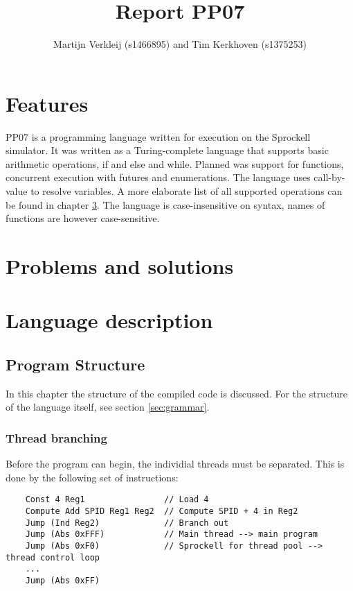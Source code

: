 \documentclass[10pt,a4paper]{report}
\author{Martijn Verkleij (s1466895) and Tim Kerkhoven (s1375253)}
\title{Report PP07}
\begin{document}
\maketitle
\tableofcontents


\chapter{Features}
PP07 is a programming language written for execution on the Sprockell simulator. It was written as a Turing-complete language that supports basic arithmetic operations, if and else and while. Planned was support for functions, concurrent execution with futures and enumerations. The language uses call-by-value to resolve variables. A more elaborate list of all supported operations can be found in chapter \ref{chp:langdesc}. The language is case-insensitive on syntax, names of functions are however case-sensitive.

\chapter{Problems and solutions}



\chapter{Language description} \label{chp:langdesc}

\section{Program Structure} \label{sec:structure}
In this chapter the structure of the compiled code is discussed. For the structure of the language itself, see section \ref{sec:grammar}. 
\subsection{Thread branching}
Before the program can begin, the individial threads must be separated. This is done by the following set of instructions:
\begin{verbatim}
	Const 4 Reg1				// Load 4
	Compute Add SPID Reg1 Reg2	// Compute SPID + 4 in Reg2
	Jump (Ind Reg2)				// Branch out
	Jump (Abs 0xFFF)			// Main thread --> main program
	Jump (Abs 0xF0)				// Sprockell for thread pool --> thread control loop
	...
	Jump (Abs 0xFF)
\end{verbatim}
\end{document}
